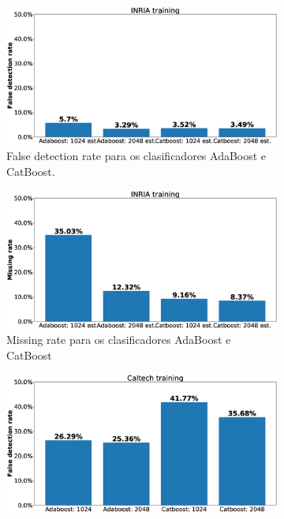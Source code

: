 \documentclass[galician]{./head/uvigo-tfg}
\begin{document}
    \begin{figure}
        \centering
        \begin{subfigure}{.475\textwidth}
          \centering
            \includegraphics[width=1.1\linewidth]{figures/inria_false_detection.eps}
          \caption{False detection rate para os clasificadores AdaBoost e CatBoost.}
          \label{fig:sub1}
        \end{subfigure}%
        \begin{subfigure}{.475\textwidth}
          \centering
          \includegraphics[width=1.1\linewidth]{figures/inria_missing_rate.eps}
          \caption{Missing rate para os clasificadores AdaBoost e CatBoost}
          \label{fig:sub2}
        \end{subfigure}
        \begin{subfigure}{.475\textwidth}
          \centering
          \includegraphics[width=1.1\linewidth]{figures/caltech_false_detection.eps}

\end{subfigure}
\end{figure}
\end{document}
